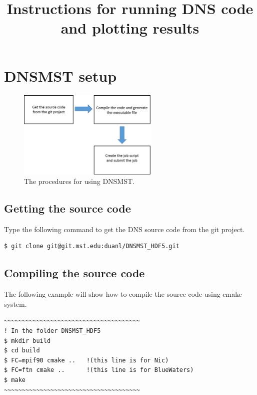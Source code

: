 \documentclass[12pt, oneside]{article}
\title{Instructions for running DNS code and plotting results}
\author{}
\begin{document}
\maketitle
\tableofcontents

\newpage

\section{DNSMST setup}

\begin{figure}[H]
  \begin{center}
  \includegraphics[width=0.6\textwidth]{FIGS/DNSMST.png}
  \caption{The procedures for using DNSMST.}
  \label{fig:BCGrid}
  \end{center}
\end{figure}

\subsection{Getting the source code}

Type the following command to get the DNS source code from the git project.

\begin{verbatim}
$ git clone git@git.mst.edu:duanl/DNSMST_HDF5.git
\end{verbatim}

\subsection{Compiling the source code}

The following example will show how to compile the source code using cmake system.

\begin{verbatim}
~~~~~~~~~~~~~~~~~~~~~~~~~~~~~~~~~~~~~~
! In the folder DNSMST_HDF5
$ mkdir build
$ cd build
$ FC=mpif90 cmake ..   !(this line is for Nic)
$ FC=ftn cmake ..      !(this line is for BlueWaters)
$ make
~~~~~~~~~~~~~~~~~~~~~~~~~~~~~~~~~~~~~~
\end{verbatim}
\end{document}
